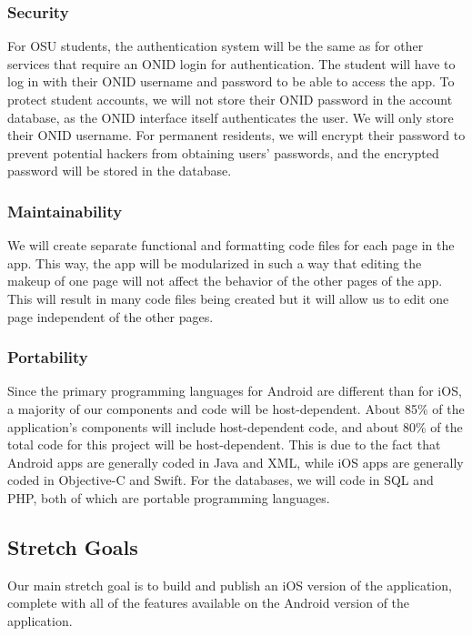 \documentclass[draftclsnofoot, onecolumn, 10pt, compsoc]{IEEEtran}
\begin{document}
			\subsubsection{Security}
				For OSU students, the authentication system will be the same as for other services that require an ONID login for authentication. The student will have to log in with their ONID username and password to be able to access the app. To protect student accounts, we will not store their ONID password in the account database, as the ONID interface itself authenticates the user. We will only store their ONID username. For permanent residents, we will encrypt their password to prevent potential hackers from obtaining users' passwords, and the encrypted password will be stored in the database.
				
			\subsubsection{Maintainability}
				We will create separate functional and formatting code files for each page in the app. This way, the app will be modularized in such a way that editing the makeup of one page will not affect the behavior of the other pages of the app. This will result in many code files being created but it will allow us to edit one page independent of the other pages.

			\subsubsection{Portability}
				Since the primary programming languages for Android are different than for iOS, a majority of our components and code will be host-dependent. About 85\% of the application's components will include host-dependent code, and about 80\% of the total code for this project will be host-dependent. This is due to the fact that Android apps are generally coded in Java and XML, while iOS apps are generally coded in Objective-C and Swift. For the databases, we will code in SQL and PHP, both of which are portable programming languages. 
		
		\subsection{Stretch Goals}
			Our main stretch goal is to build and publish an iOS version of the application, complete with all of the features available on the Android version of the application.
			
\end{document}
